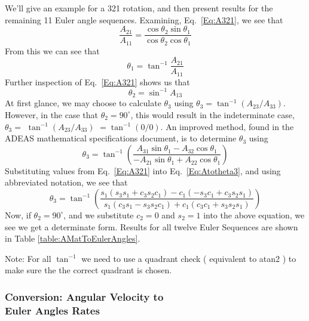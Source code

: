 We'll give an example for a 321 rotation, and then present results
for the remaining 11 Euler angle sequences.  Examining,
Eq.~\ref{Eq:A321}, we see that
%
\begin{equation}
     \frac{A_{21} }{ A_{11}} = \frac{\cos{\theta_2}\sin{\theta_1}}
                                    {\cos{\theta_2}\cos{\theta_1}}
\end{equation}
%
From this we can see that
%
\begin{equation}
    \theta_1 =  \tan^{-1}{\frac{ A_{21} }  { A_{11}  }}
\end{equation}
%
Further inspection of Eq.~\ref{Eq:A321} shows us that
%
\begin{equation}
    \theta_2 = \sin^{-1}{A_{13}}
\end{equation}
%
At first glance, we may choose to calculate $\theta_3$ using
$\theta_3 = \tan^{-1}{(A_{23}/A_{33})}$.  However, in the case that
$\theta_2 = 90^\circ$, this would result in the indeterminate case,
$\theta_3 =$ $\tan^{-1}(A_{23}/A_{33})$ $= \tan^{-1}(0/0)$.  An
improved method, found in the ADEAS mathematical specifications
document, is to determine $\theta_3$ using
%
\begin{equation}
    \theta_3 = \tan^{-1} \left(\frac{ A_{31} \sin{\theta_1} - A_{32} \cos{\theta_1} }
    { -A_{21} \sin{\theta_1} + A_{22} \cos{\theta_1}} \right)
    \label{Eq:Atotheta3}
\end{equation}
%
Substituting values from Eq.~\ref{Eq:A321} into
Eq.~\ref{Eq:Atotheta3}, and using abbreviated notation, we see
that
%
\begin{equation}
     \theta_3 = \tan^{-1} \left(  \frac{ s_1( s_3s_1 + c_3s_2c_1) - c_1(-s_3c_1 + c_3s_2s_1 )}
    { s_1(c_3s_1 - s_3s_2c_1  ) + c_1( c_3c_1 + s_3s_2s_1 ) }  \right)
\end{equation}
%
Now, if $\theta_2 = 90^\circ$, and we substitute $c_2 = 0$ and $s_2 = 1$ into
the above equation, we see we get a determinate form.
Results for all twelve Euler Sequences are shown in Table
\ref{table:AMatToEulerAngles}.

\noindent Note:  For all $\tan^{-1}$ we need to use a quadrant check ( equivalent
to atan2 ) to make sure the the correct quadrant is chosen.

\subsubsection{Conversion:  Angular Velocity to \\ Euler Angles
Rates}

